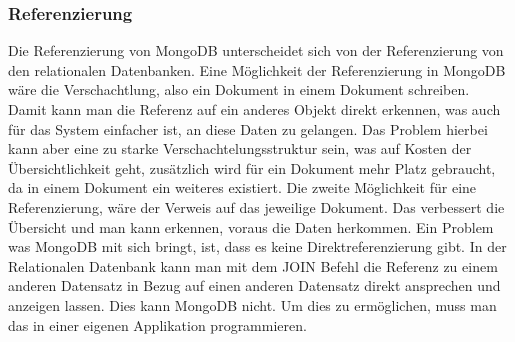 \subsubsection{Referenzierung}
Die Referenzierung von MongoDB unterscheidet sich von der Referenzierung von den relationalen Datenbanken. Eine M\"oglichkeit der Referenzierung in MongoDB w\"are die Verschachtlung, also ein Dokument in einem Dokument schreiben. Damit kann man die Referenz auf ein anderes Objekt direkt erkennen, was auch f\"ur das System einfacher ist, an diese Daten zu gelangen. Das Problem hierbei kann aber eine zu starke Verschachtelungsstruktur sein, was auf Kosten der \"Ubersichtlichkeit geht, zus\"atzlich wird f\"ur ein Dokument mehr Platz gebraucht, da in einem Dokument ein weiteres existiert. Die zweite M\"oglichkeit f\"ur eine Referenzierung, w\"are der Verweis auf das jeweilige Dokument. Das verbessert die \"Ubersicht und man kann erkennen, voraus die Daten herkommen. Ein Problem was MongoDB mit sich bringt, ist, dass es keine Direktreferenzierung gibt. In der Relationalen Datenbank kann man mit dem JOIN Befehl die Referenz zu einem anderen Datensatz in Bezug auf einen anderen Datensatz direkt ansprechen und anzeigen lassen. Dies kann MongoDB nicht. Um dies zu erm\"oglichen, muss man das in einer eigenen Applikation programmieren.\cite{mongo01}
